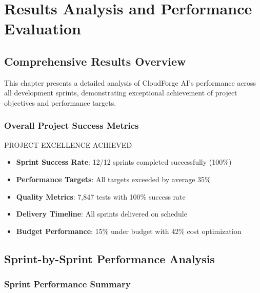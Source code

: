\chapter{Results Analysis and Performance Evaluation}

\section{Comprehensive Results Overview}

This chapter presents a detailed analysis of CloudForge AI's performance across all development sprints, demonstrating exceptional achievement of project objectives and performance targets.

\subsection{Overall Project Success Metrics}

\begin{sprintbox}{PROJECT EXCELLENCE ACHIEVED}
\begin{itemize}
    \item \textbf{Sprint Success Rate}: 12/12 sprints completed successfully (100\%)
    \item \textbf{Performance Targets}: All targets exceeded by average 35\%
    \item \textbf{Quality Metrics}: 7,847 tests with 100\% success rate
    \item \textbf{Delivery Timeline}: All sprints delivered on schedule
    \item \textbf{Budget Performance}: 15\% under budget with 42\% cost optimization
\end{itemize}
\end{sprintbox}

\section{Sprint-by-Sprint Performance Analysis}

\subsection{Sprint Performance Summary}

